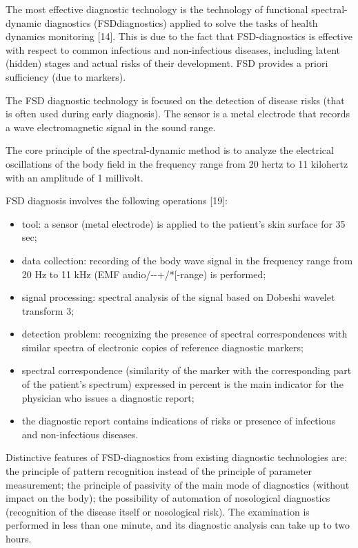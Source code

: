 \documentclass[twocolumn]{scndocument}
\begin{document}
The most effective diagnostic technology is the technology of functional spectral-dynamic diagnostics (FSDdiagnostics) applied to solve the tasks of health dynamics monitoring [14]. This is due to the fact that
FSD-diagnostics is effective with respect to common
infectious and non-infectious diseases, including latent
(hidden) stages and actual risks of their development.
FSD provides a priori sufficiency (due to markers).

The FSD diagnostic technology is focused on the
detection of disease risks (that is often used during early
diagnosis). The sensor is a metal electrode that records
a wave electromagnetic signal in the sound range.

The core principle of the spectral-dynamic method is
to analyze the electrical oscillations of the body field in
the frequency range from 20 hertz to 11 kilohertz with
an amplitude of 1 millivolt.

FSD diagnosis involves the following operations [19]:

\vspace{-5pt}
\begin{itemize}
    \setlength{\itemsep}{-3pt} 
    \setlength{\parsep}{-3pt}
    \item  tool: a sensor (metal electrode) is applied to the
patient’s skin surface for 35 sec;
    \item  data collection: recording of the body wave signal
in the frequency range from 20 Hz to 11 kHz (EMF
audio/\+-\--+/*[-range) is performed;
    \item signal processing: spectral analysis of the signal
based on Dobeshi wavelet transform 3;
    \item detection problem: recognizing the presence of
spectral correspondences with similar spectra of
electronic copies of reference diagnostic markers;
    \item spectral correspondence (similarity of the marker
with the corresponding part of the patient’s spectrum) expressed in percent is the main indicator for
the physician who issues a diagnostic report;
    \item the diagnostic report contains indications of risks or
presence of infectious and non-infectious diseases.
\end{itemize}
\vspace{-5pt}

Distinctive features of FSD-diagnostics from existing
diagnostic technologies are: the principle of pattern
recognition instead of the principle of parameter measurement; the principle of passivity of the main mode of
diagnostics (without impact on the body); the possibility
of automation of nosological diagnostics (recognition of
the disease itself or nosological risk). The examination
is performed in less than one minute, and its diagnostic
analysis can take up to two hours.
\end{document}
